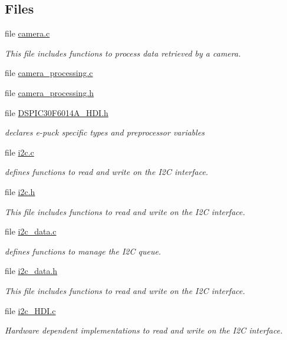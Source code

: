 \subsection*{Files}
\begin{DoxyCompactItemize}
\item 
file \hyperlink{camera_8c}{camera.\+c}
\begin{DoxyCompactList}\small\item\em This file includes functions to process data retrieved by a camera. \end{DoxyCompactList}\item 
file \hyperlink{camera__processing_8c}{camera\+\_\+processing.\+c}
\item 
file \hyperlink{camera__processing_8h}{camera\+\_\+processing.\+h}
\item 
file \hyperlink{DSPIC30F6014A__HDI_8h}{D\+S\+P\+I\+C30\+F6014\+A\+\_\+\+H\+D\+I.\+h}
\begin{DoxyCompactList}\small\item\em declares e-\/puck specific types and preprocessor variables \end{DoxyCompactList}\item 
file \hyperlink{i2c_8c}{i2c.\+c}
\begin{DoxyCompactList}\small\item\em defines functions to read and write on the I2\+C interface. \end{DoxyCompactList}\item 
file \hyperlink{i2c_8h}{i2c.\+h}
\begin{DoxyCompactList}\small\item\em This file includes functions to read and write on the I2\+C interface. \end{DoxyCompactList}\item 
file \hyperlink{i2c__data_8c}{i2c\+\_\+data.\+c}
\begin{DoxyCompactList}\small\item\em defines functions to manage the I2\+C queue. \end{DoxyCompactList}\item 
file \hyperlink{i2c__data_8h}{i2c\+\_\+data.\+h}
\begin{DoxyCompactList}\small\item\em This file includes functions to read and write on the I2\+C interface. \end{DoxyCompactList}\item 
file \hyperlink{i2c__HDI_8c}{i2c\+\_\+\+H\+D\+I.\+c}
\begin{DoxyCompactList}\small\item\em Hardware dependent implementations to read and write on the I2\+C interface. \end{DoxyCompactList}\item 

\end{DoxyCompactItemize}
